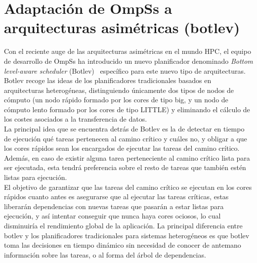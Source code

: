 \section{Adaptación de OmpSs a arquitecturas asimétricas (botlev)}
Con el reciente auge de las arquitecturas asimétricas en el mundo HPC, el
equipo de desarrollo de OmpSs ha introducido un nuevo planificador
denominado \emph{Bottom level-aware scheduler} (Botlev)~\cite{botlev}
específico para este nuevo tipo de arquitecturas. Botlev recoge las ideas
de los planificadores tradicionales basados en arquitecturas heterogéneas,
distinguiendo únicamente dos tipos de nodos de cómputo (un nodo rápido
formado por los cores de tipo big, y un nodo de cómputo lento formado por
los cores de tipo LITTLE) y eliminando el
cálculo de los costes asociados a la transferencia de datos. \\
La principal idea que se encuentra detrás de Botlev es la de detectar en
tiempo de ejecución qué tareas pertenecen al camino crítico y cuáles no, y
obligar a que los cores rápidos sean los encargados de ejecutar las tareas
del camino crítico. Además, en caso de existir alguna tarea perteneciente
al camino crítico lista para ser ejecutada, esta tendrá preferencia sobre
el resto de tareas que también estén listas para ejecución.\\
El objetivo de garantizar que las tareas del camino crítico se ejecutan en
los cores rápidos cuanto antes es asegurarse que al ejecutar las tareas
críticas, estas liberarán dependencias con nuevas tareas que pasarán a
estar listas para ejecución, y así intentar conseguir que nunca haya cores
ociosos, lo cual disminuiría el rendimiento global de la aplicación. La
principal diferencia entre botlev y los planificadores tradicionales para
sistemas heterogéneos es que botlev toma las decisiones en tiempo dinámico
sin necesidad de conocer de antemano información sobre las tareas, o al
forma del árbol de dependencias.

